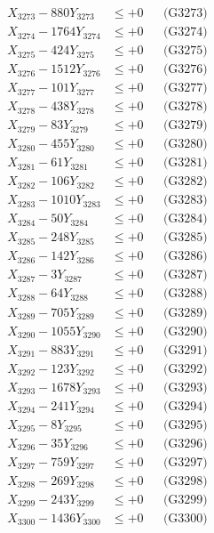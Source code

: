 \documentclass[a4paper,10pt]{article}
\begin{document}
{\begin{align}
X_{3273} - 880Y_{3273} &\leq +0 && \text{(G3273)} \\
X_{3274} - 1764Y_{3274} &\leq +0 && \text{(G3274)} \\
X_{3275} - 424Y_{3275} &\leq +0 && \text{(G3275)} \\
X_{3276} - 1512Y_{3276} &\leq +0 && \text{(G3276)} \\
X_{3277} - 101Y_{3277} &\leq +0 && \text{(G3277)} \\
X_{3278} - 438Y_{3278} &\leq +0 && \text{(G3278)} \\
X_{3279} - 83Y_{3279} &\leq +0 && \text{(G3279)} \\
X_{3280} - 455Y_{3280} &\leq +0 && \text{(G3280)} \\
\allowbreak
X_{3281} - 61Y_{3281} &\leq +0 && \text{(G3281)} \\
X_{3282} - 106Y_{3282} &\leq +0 && \text{(G3282)} \\
X_{3283} - 1010Y_{3283} &\leq +0 && \text{(G3283)} \\
X_{3284} - 50Y_{3284} &\leq +0 && \text{(G3284)} \\
X_{3285} - 248Y_{3285} &\leq +0 && \text{(G3285)} \\
X_{3286} - 142Y_{3286} &\leq +0 && \text{(G3286)} \\
X_{3287} - 3Y_{3287} &\leq +0 && \text{(G3287)} \\
X_{3288} - 64Y_{3288} &\leq +0 && \text{(G3288)} \\
X_{3289} - 705Y_{3289} &\leq +0 && \text{(G3289)} \\
X_{3290} - 1055Y_{3290} &\leq +0 && \text{(G3290)} \\
\allowbreak
X_{3291} - 883Y_{3291} &\leq +0 && \text{(G3291)} \\
X_{3292} - 123Y_{3292} &\leq +0 && \text{(G3292)} \\
X_{3293} - 1678Y_{3293} &\leq +0 && \text{(G3293)} \\
X_{3294} - 241Y_{3294} &\leq +0 && \text{(G3294)} \\
X_{3295} - 8Y_{3295} &\leq +0 && \text{(G3295)} \\
X_{3296} - 35Y_{3296} &\leq +0 && \text{(G3296)} \\
X_{3297} - 759Y_{3297} &\leq +0 && \text{(G3297)} \\
X_{3298} - 269Y_{3298} &\leq +0 && \text{(G3298)} \\
X_{3299} - 243Y_{3299} &\leq +0 && \text{(G3299)} \\
X_{3300} - 1436Y_{3300} &\leq +0 && \text{(G3300)} \\

\end{align}}
\end{document}
